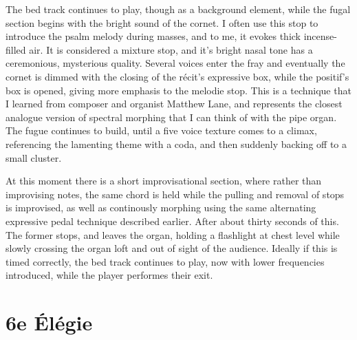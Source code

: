 \documentclass[12pt,twoside,maitrise]{dms_ks}
\theoremstyle{definition}
\begin{document}


The bed track continues to play, though as a background element, while the fugal section begins with the bright sound of the cornet. I often use this stop to introduce the psalm melody during masses, and to me, it evokes thick incense-filled air. It is considered a mixture stop, and it's bright nasal tone has a ceremonious, mysterious quality. Several voices enter the fray and eventually the cornet is dimmed with the closing of the récit's expressive box, while the positif's box is opened, giving more emphasis to the melodie stop. This is a technique that I learned from composer and organist Matthew Lane, and represents the closest analogue version of spectral morphing that I can think of with the pipe organ. The fugue continues to build, until a five voice texture comes to a climax, referencing the lamenting theme with a coda, and then suddenly backing off to a small cluster.



At this moment there is a short improvisational section, where rather than improvising notes, the same chord is held while the pulling and removal of stops is improvised, as well as continously morphing using the same alternating expressive pedal technique described earlier. After about thirty seconds of this. The former stops, and leaves the organ, holding a flashlight at chest level while slowly crossing the organ loft and out of sight of the audience. Ideally if this is timed correctly, the bed track continues to play, now with lower frequencies introduced, while the player performes their exit.


\section{6e Élégie}
\end{document}
